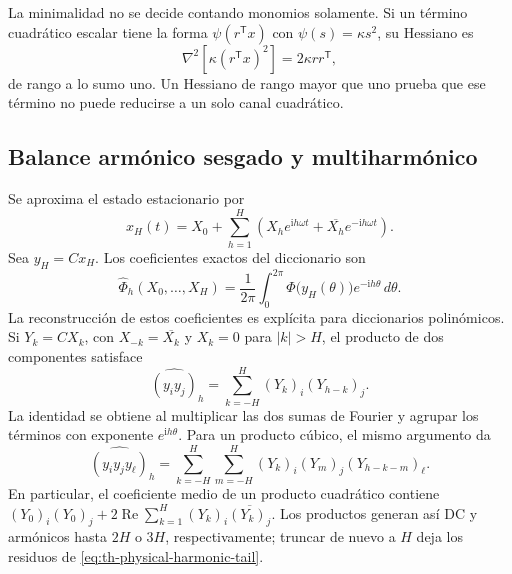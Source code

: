 La minimalidad no se decide contando monomios solamente. Si un término
cuadrático escalar tiene la forma \(\psi(r^{\mathsf T}x)\) con
\(\psi(s)=\kappa s^2\), su Hessiano es
\[
 \nabla^2[\kappa(r^{\mathsf T}x)^2]=2\kappa rr^{\mathsf T},
\]
de rango a lo sumo uno. Un Hessiano de rango mayor que uno prueba que ese
término no puede reducirse a un solo canal cuadrático.

\subsection{Balance armónico sesgado y multiharmónico}
\label{sec:multiharmonic}

Se aproxima el estado estacionario por
\begin{equation}
 x_H(t)=X_0+
 \sum_{h=1}^{H}\left(X_he^{\mathrm i h\omega t}
 +\overline{X_h}e^{-\mathrm i h\omega t}\right).
 \label{eq:th-fourier-state}
\end{equation}
Sea \(y_H=Cx_H\). Los coeficientes exactos del diccionario son
\begin{equation}
 \widehat\Phi_h(X_0,\ldots,X_H)
 =\frac1{2\pi}\int_0^{2\pi}
 \Phi\!\bigl(y_H(\theta)\bigr)e^{-\mathrm i h\theta}\,d\theta.
 \label{eq:th-phi-fourier}
\end{equation}
La reconstrucción de estos coeficientes es explícita para diccionarios
polinómicos. Si \(Y_k=CX_k\), con \(X_{-k}=\overline{X_k}\) y
\(X_k=0\) para \(|k|>H\), el producto de dos componentes satisface
\begin{equation}
 \widehat{(y_i y_j)}_h
 =\sum_{k=-H}^{H}(Y_k)_i(Y_{h-k})_j.
 \label{eq:th-quadratic-convolution}
\end{equation}
La identidad se obtiene al multiplicar las dos sumas de Fourier y agrupar
los términos con exponente \(e^{\mathrm ih\theta}\). Para un producto
cúbico, el mismo argumento da
\begin{equation}
 \widehat{(y_i y_j y_\ell)}_h
 =\sum_{k=-H}^{H}\sum_{m=-H}^{H}
 (Y_k)_i(Y_m)_j(Y_{h-k-m})_\ell.
 \label{eq:th-cubic-convolution}
\end{equation}
En particular, el coeficiente medio de un producto cuadrático contiene
\((Y_0)_i(Y_0)_j+2\operatorname{Re}\sum_{k=1}^{H}
(Y_k)_i\overline{(Y_k)_j}\). Los productos generan así DC y armónicos
hasta \(2H\) o \(3H\), respectivamente; truncar de nuevo a \(H\) deja
los residuos de \cref{eq:th-physical-harmonic-tail}.

